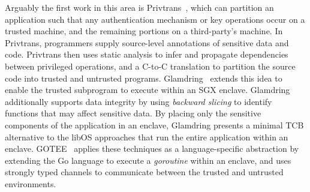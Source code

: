 %
Arguably the first work in this area is Privtrans~\cite{privtrans}, which
can partition an application such that any authentication mechanism or key
operations occur on a trusted machine, and the remaining portions on a
third-party's machine.
%
In Privtrans, programmers supply source-level annotations of sensitive data and
code.
%
Privtrans then uses static analysis to infer and propagate dependencies between
privileged operations, and a C-to-C translation to partition the source code
into trusted and untrusted programs.
%
Glamdring~\cite{glamdring} extends this idea to enable the trusted
subprogram to execute within an SGX enclave.
%
Glamdring additionally supports data integrity by using \emph{backward
slicing} to identify functions that may affect sensitive data.
%
By placing only the sensitive components of the application in an enclave,
Glamdring presents a minimal TCB alternative to the libOS approaches that
run the entire application within an enclave.
%
GOTEE~\cite{secured-routines} applies these techniques as  a language-specific
abstraction by extending the Go language to execute a \emph{goroutine} within
an enclave, and uses strongly typed channels to communicate between the trusted
and untrusted environments.








